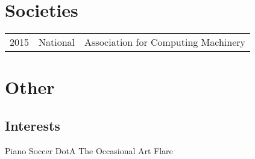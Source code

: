 \documentclass[]{deedy-resume-openfont}
\begin{document}
\begin{minipage}[t]{0.66\textwidth}

\section{Societies} 

\begin{tabular}{rll}
2015         & National  & Association for Computing Machinery\\
\end{tabular}

\sectionsep


\section{Other} 
\subsection{Interests}
Piano \textbullet{} Soccer \textbullet{} DotA \textbullet{} The Occasional Art Flare \\
\sectionsep

\end{minipage} 
\end{document}
